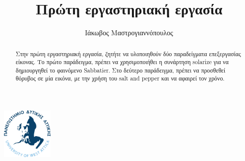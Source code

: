 \documentclass{fphw}
\title{Πρώτη εργαστηριακή εργασία}
\author{Ιάκωβος Μαστρογιαννόπουλος}
\institute{Πανεπιστημιο Δυτικης Αττικης \\ Τμημα Μηχανικων Πληροφορικης και Υπολογιστων}
\begin{document}
\includegraphics[width=25mm]{Figures/Logo}
\maketitle

\newpage
\tableofcontents
\newpage
\lstlistoflistings
\listoffigures
\listoftables

\newpage
\begin{abstract}
	Στην πρώτη εργαστηριακή εργασία, ζητήτε να υλοποιηθούν δύο παραδείγματα επεξεργασίας είκονας. Το πρώτο παράδειγμα, πρέπει να χρησιμοποιήθει η συνάρτηση solarize 
	για να δημιουργηθεί το φαινόμενο Sabbatier. Στο δεύτερο παράδειγμα, πρέπει να προσθεθεί θόρυβος σε μία εικόνα, με την χρήση του salt and pepper και να αφαιρεί τον χρόνο. 
\end{abstract}

\newpage



\end{document}
